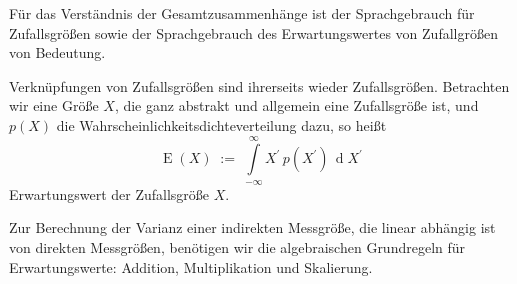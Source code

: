 Für das Verständnis der Gesamtzusammenhänge ist der Sprachgebrauch für Zufallsgrößen sowie
der Sprachgebrauch des Erwartungswertes von Zufallgrößen von Bedeutung. 

Verknüpfungen von Zufallsgrößen sind ihrerseits wieder Zufallsgrößen. Betrachten
wir eine Größe $X$, die ganz abstrakt und allgemein eine Zufallsgröße ist, und
$p(X)$ die Wahrscheinlichkeitsdichteverteilung dazu, so heißt
\begin{equation}
\operatorname{E}(X) \; := \;  \int\limits_{-\infty}^{\infty}
X^\prime \, p(X^\prime) \, \operatorname{d} X^\prime
\end{equation}
Erwartungswert der Zufallsgröße $X$.

Zur Berechnung der Varianz einer indirekten Messgröße, die linear abhängig ist
von direkten Messgrößen, benötigen wir die algebraischen Grundregeln für
Erwartungswerte: Addition, Multiplikation und Skalierung.

